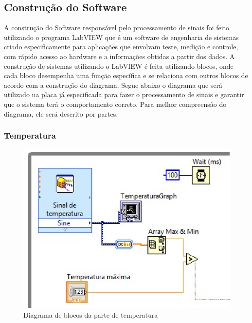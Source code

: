 \subsection{Construção do Software}

A construção do Software responsável pelo processamento de sinais foi feito utilizando o programa LabVIEW que é um software de engenharia de sistemas criado especificamente para aplicações que envolvam teste, medição e controle, com rápido acesso ao hardware e a informações obtidas a partir dos dados.
A construção de sistemas utilizando o LabVIEW é feita utilizando blocos, onde cada bloco desempenha uma função específica e se relaciona com outros blocos de acordo com a construção do diagrama.
Segue abaixo o diagrama que será utilizado na placa já especificada para fazer o processamento de sinais e garantir que o sistema terá o comportamento correto. Para melhor compreensão do diagrama, ele será descrito por partes.

\subsubsection{Temperatura}

\begin{figure}[!htb]                                                             
    \centering                                                                      
    \includegraphics[scale=0.6, keepaspectratio=true]{figuras/detalhado/temp_labview.eps} 
    \caption{Diagrama de blocos da parte de temperatura}\label{temp1}
 \end{figure}

